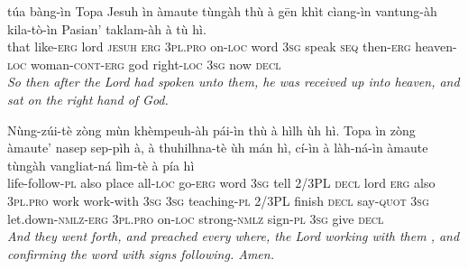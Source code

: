 \documentclass[11pt,a4paper]{article}
\begin{document}
\begin{exe}
\gll túa bàng-ìn Topa Jesuh ìn àmaute tùngàh thù à gēn khìt cìang-ìn vantung-àh kila-tò-ìn Pasian' taklam-àh à tù hì. \\
     that like-\textsc{erg} lord \textsc{jesuh} \textsc{erg} \textsc{3pl}.\textsc{pro} on-\textsc{loc} word \textsc{3sg} speak \textsc{seq} then-\textsc{erg} heaven-\textsc{loc} woman-\textsc{cont}-\textsc{erg} god right-\textsc{loc} \textsc{3sg} now \textsc{decl} \\
\glt \textcolor{kjvcolor}{\textit{So then after the Lord had spoken unto them, he was received up into heaven, and sat on the right hand of God.}}

\gll Nùng-zúi-tè zòng mùn khèmpeuh-àh pái-ìn thù à hìlh ùh hì. Topa ìn zòng àmaute' nasep sep-pìh à, à thuhilhna-tè ùh mán hì, cí-ìn à làh-ná-ìn àmaute tùngàh vangliat-ná lìm-tè à pía hì \\
     life-follow-\textsc{pl} also place all-\textsc{loc} go-\textsc{erg} word \textsc{3sg} tell 2/3PL \textsc{decl} lord \textsc{erg} also \textsc{3pl}.\textsc{pro} work work-with \textsc{3sg} \textsc{3sg} teaching-\textsc{pl} 2/3PL finish \textsc{decl} say-\textsc{quot} \textsc{3sg} let.down-\textsc{nmlz}-\textsc{erg} \textsc{3pl}.\textsc{pro} on-\textsc{loc} strong-\textsc{nmlz} sign-\textsc{pl} \textsc{3sg} give \textsc{decl} \\
\glt \textcolor{kjvcolor}{\textit{And they went forth, and preached every where, the Lord working with them , and confirming the word with signs following. Amen.}}

\end{exe}
\newpage
\end{document}

